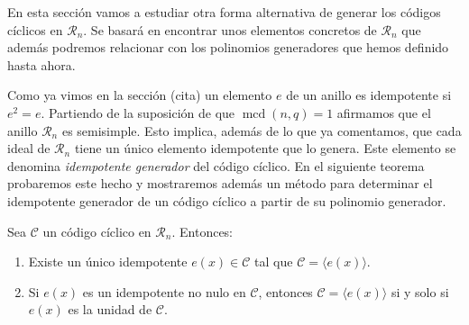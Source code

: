 En esta sección vamos a estudiar otra forma alternativa de generar los códigos cíclicos en \(\mathcal R_n\).
Se basará en encontrar unos elementos concretos de \(\mathcal R_n\) que además podremos relacionar con los polinomios generadores que hemos definido hasta ahora.

Como ya vimos en la sección (cita) un elemento \(e\) de un anillo es idempotente si \(e^2 = e\).
Partiendo de la suposición de que \(\operatorname{mcd}(n, q) = 1\) afirmamos que el anillo \(\mathcal R_n\) es semisimple.
Esto implica, además de lo que ya comentamos, que cada ideal de \(\mathcal R_n\) tiene un único elemento idempotente que lo genera.
Este elemento se denomina \textit{idempotente generador} del código cíclico.
En el siguiente teorema probaremos este hecho y mostraremos además un método para determinar el idempotente generador de un código cíclico a partir de su polinomio generador.

\begin{theorem}
  \label{th:idempotente-unico-unidad}
  Sea \(\mathcal C\) un código cíclico en \(\mathcal R_n\). Entonces:
  \begin{enumerate}
    \item Existe un único idempotente \(e(x) \in \mathcal C\) tal que \(\mathcal C = \langle e(x)\rangle\).
    \item Si \(e(x)\) es un idempotente no nulo en \(\mathcal C\), entonces \(\mathcal C = \langle e(x)\rangle\) si y solo si \(e(x)\) es la unidad de \(\mathcal C\).
  \end{enumerate}
\end{theorem}

